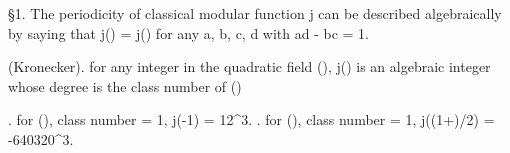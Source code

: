 
  \S 1. The periodicity of classical modular function j can be 
described algebraically by saying that j(\tau) = j() 
for any a, b, c, d \in \Z with ad - bc = 1.

\theorem (Kronecker). for any integer \tau in the quadratic field \Q(), 
j(\tau) is an algebraic integer whose degree is the class number of \Q()

\example. for \Q(), class number = 1, j(-1) = 12^3.
\example. for \Q(), class number = 1, j((1+)/2) = -640320^3.
